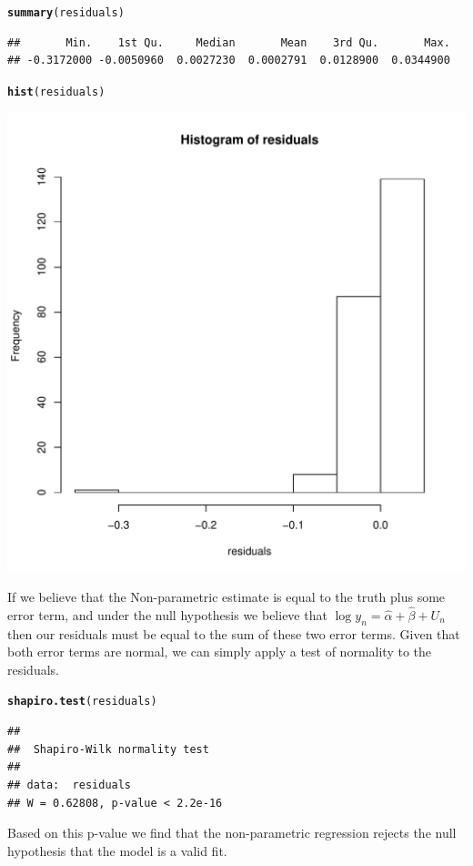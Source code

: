 \documentclass[10pt]{paper}\usepackage[]{graphicx}\usepackage[]{color}
\makeatletter
\def\maxwidth{ %
  \ifdim\Gin@nat@width>\linewidth
    \linewidth
  \else
    \Gin@nat@width
  \fi
}
\newcommand{\hlstd}[1]{\textcolor[rgb]{0.345,0.345,0.345}{#1}}%
\newcommand{\hlkwd}[1]{\textcolor[rgb]{0.737,0.353,0.396}{\textbf{#1}}}%
\newenvironment{kframe}{%
 \def\at@end@of@kframe{}%
 \ifinner\ifhmode%
  \def\at@end@of@kframe{\end{minipage}}%
  \begin{minipage}{\columnwidth}%
 \fi\fi%
 \def\FrameCommand##1{\hskip\@totalleftmargin \hskip-\fboxsep
 \colorbox{shadecolor}{##1}\hskip-\fboxsep
     \hskip-\linewidth \hskip-\@totalleftmargin \hskip\columnwidth}%
 \MakeFramed {\advance\hsize-\width
   \@totalleftmargin\z@ \linewidth\hsize
   \@setminipage}}%
 {\par\unskip\endMakeFramed%
 \at@end@of@kframe}
\newenvironment{knitrout}{}{} %
\makeatother
\begin{document}
\begin{knitrout}
\begin{kframe}
\begin{alltt}
\hlkwd{summary}\hlstd{( residuals )}
\end{alltt}
\begin{verbatim}
##       Min.    1st Qu.     Median       Mean    3rd Qu.       Max. 
## -0.3172000 -0.0050960  0.0027230  0.0002791  0.0128900  0.0344900
\end{verbatim}
\begin{alltt}
\hlkwd{hist}\hlstd{( residuals )}
\end{alltt}
\end{kframe}
\includegraphics[width=\maxwidth]{figure/unnamed-chunk-2-2} 

\end{knitrout}
If we believe that the Non-parametric estimate is equal to the truth
plus some error term, and under the null hypothesis we believe that
$\log{ y_n } = \hat{\alpha} + \hat{\beta} + U_n$ then our residuals must be
equal to the sum of these two error terms. Given that both error terms
are normal, we can simply apply a test of normality to the residuals. 
 

\begin{knitrout}
\color{fgcolor}\begin{kframe}
\begin{alltt}
\hlkwd{shapiro.test}\hlstd{(residuals)}
\end{alltt}
\begin{verbatim}
## 
## 	Shapiro-Wilk normality test
## 
## data:  residuals
## W = 0.62808, p-value < 2.2e-16
\end{verbatim}
\end{kframe}
\end{knitrout}

Based on this p-value we find that the non-parametric regression
rejects the null hypothesis that the model is a valid fit.
\end{document}
